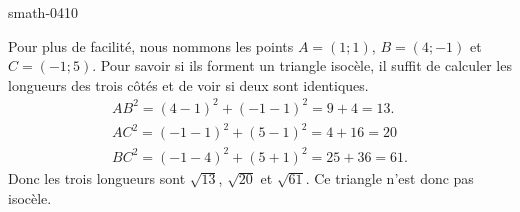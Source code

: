 
\begin{corrige}{smath-0410}

    Pour plus de facilité, nous nommons les points \( A=(1;1)\), \( B=(4;-1)\) et \( C=(-1;5)\). Pour savoir si ils forment un triangle isocèle, il suffit de calculer les longueurs des trois côtés et de voir si deux sont identiques.
    \begin{subequations}
        \begin{align}
            AB^2=(4-1)^2+(-1-1)^2=9+4=13.\\
            AC^2=(-1-1)^2+(5-1)^2=4+16=20\\
            BC^2=(-1-4)^2+(5+1)^2=25+36=61.
        \end{align}
    \end{subequations}
    Donc les trois longueurs sont \( \sqrt{13}\), \( \sqrt{20}\) et \( \sqrt{61}\). Ce triangle n'est donc pas isocèle.

\end{corrige}
